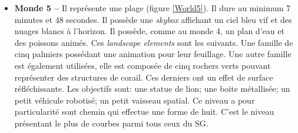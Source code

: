 \begin{itemize}
			\begin{minipage}{\linewidth}
				\label{World4}
			\end{minipage}\medskip
			
			\item \textbf{Monde 5 --} Il représente une plage (figure \ref{World5}). Il dure au minimum 7 minutes et 48 secondes. Il possède une \textit{skybox} affichant un ciel bleu vif et des nuages blancs à l'horizon. Il possède, comme au monde 4, un plan d'eau et des poissons animés. Ces \textit{landscape elements} sont les suivants. Une famille de cinq palmiers possédant une animation pour leur feuillage. Une autre famille est également utilisées, elle est composée de cinq rochers verts pouvant représenter des structures de corail. Ces derniers ont un effet de surface réfléchissante. Les objectifs sont: une statue de lion; une boite métallisée; un petit véhicule robotisé; un petit vaisseau spatial. Ce niveau a pour particularité sont chemin qui effectue une forme de huit. C'est le niveau présentant le plus de courbes parmi tous ceux du SG.	\medskip		
			
			\begin{minipage}{\linewidth}
				\label{World5}
			\end{minipage}\medskip		
		\end{itemize}
		
